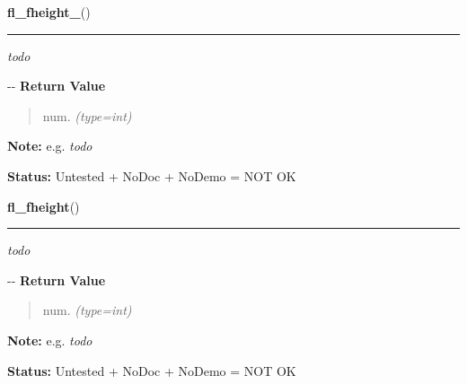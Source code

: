    \label{xformslib:flmisc:fl_fheight_}

    \vspace{0.5ex}

\hspace{.8\funcindent}\begin{boxedminipage}{\funcwidth}

    \raggedright \textbf{fl\_fheight\_}()

    \vspace{-1.5ex}

    \rule{\textwidth}{0.5\fboxrule}
\setlength{\parskip}{2ex}

\emph{todo}

-{}-
\setlength{\parskip}{1ex}
      \textbf{Return Value}
    \vspace{-1ex}

      \begin{quote}

num.
      {\it (type=int)}

      \end{quote}

\textbf{Note:} 
e.g. \emph{todo}


\textbf{Status:} 
Untested + NoDoc + NoDemo = NOT OK


    \end{boxedminipage}

    \label{xformslib:flmisc:fl_fheight_}

    \vspace{0.5ex}

\hspace{.8\funcindent}\begin{boxedminipage}{\funcwidth}

    \raggedright \textbf{fl\_fheight}()

    \vspace{-1.5ex}

    \rule{\textwidth}{0.5\fboxrule}
\setlength{\parskip}{2ex}

\emph{todo}

-{}-
\setlength{\parskip}{1ex}
      \textbf{Return Value}
    \vspace{-1ex}

      \begin{quote}

num.
      {\it (type=int)}

      \end{quote}

\textbf{Note:} 
e.g. \emph{todo}


\textbf{Status:} 
Untested + NoDoc + NoDemo = NOT OK


    \end{boxedminipage}

